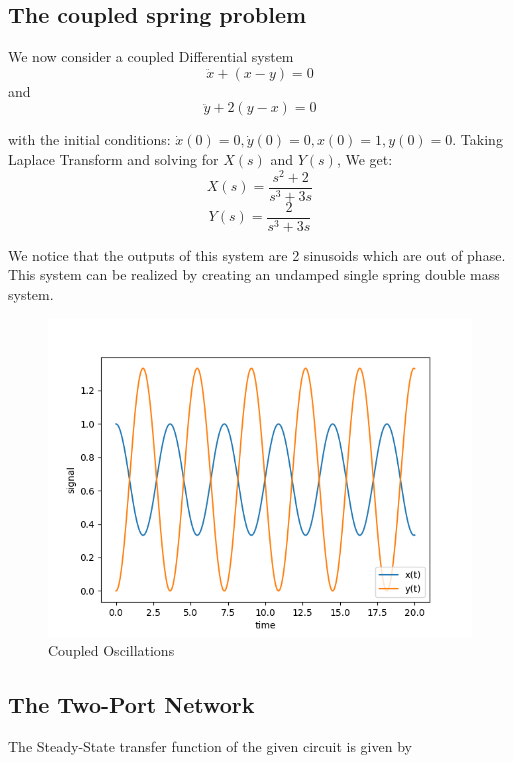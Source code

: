 \documentclass{article}
\begin{document}
\subsection{The coupled spring problem}

We now consider a coupled Differential system
\begin{equation}
    \ddot x + (x-y) = 0
\end{equation}
and 
\begin{equation}
    \ddot y + 2(y-x) = 0
\end{equation}

with the initial conditions: $\dot x(0) =0,\dot y(0) =0,x(0) =1,y(0) =0$.
Taking Laplace Transform and solving for $X(s)$ and $Y(s)$, We get:
\begin{equation}
    X(s) = \frac{s^2+2}{s^3 + 3s}
\end{equation}
\begin{equation}
    Y(s) = \frac{2}{s^3 + 3s}
\end{equation}

We notice that the outputs of this system are 2 sinusoids which are out of phase. This system can be realized by creating an undamped single spring double mass system.
\begin{figure}[h!]
\centering
\includegraphics[scale=0.6]{fig3.png}
\caption{Coupled Oscillations}
\label{fig:Coupled Oscillations}
\end{figure}
\clearpage


\subsection{The Two-Port Network}
The Steady-State transfer function of the given circuit is given by
\end{document}
